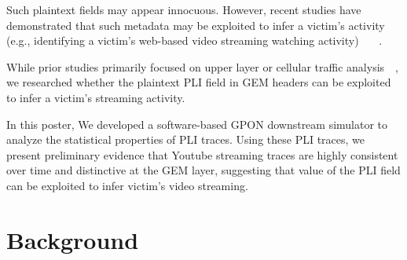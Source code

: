 \documentclass[conference]{IEEEtran}
\begin{document}
Such plaintext fields may appear innocuous. However, recent studies have demonstrated that such metadata may be exploited to infer a victim's activity (e.g., identifying a victim's web-based video streaming watching activity) ~\cite{bae-sec22}~\cite{ytyt}~\cite{ytyt2}.

While prior studies primarily focused on upper layer or cellular traffic analysis~\cite{bae-sec22}~\cite{ytyt}, we researched whether the plaintext PLI field in GEM headers can be exploited to infer a victim's streaming activity.

In this poster, We developed a software-based GPON downstream simulator to analyze the statistical properties of PLI traces. Using these PLI traces, we present preliminary evidence that Youtube streaming traces are highly consistent over time and distinctive at the GEM layer, suggesting that value of the PLI field can be exploited to infer victim's video streaming.

\section{Background}  

\end{document}
